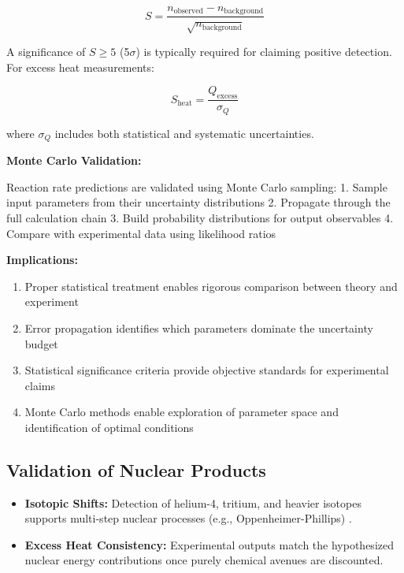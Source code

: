 \documentclass[11pt,a4paper]{article}
\begin{document}
\begin{equation}
S = \frac{n_{\text{observed}} - n_{\text{background}}}{\sqrt{n_{\text{background}}}}
\end{equation}

A significance of $S \geq 5$ (5$\sigma$) is typically required for claiming positive detection. For excess heat measurements:

\begin{equation}
S_{\text{heat}} = \frac{Q_{\text{excess}}}{\sigma_Q}
\end{equation}

where $\sigma_Q$ includes both statistical and systematic uncertainties.

\textbf{Monte Carlo Validation:}

Reaction rate predictions are validated using Monte Carlo sampling: 1. Sample input parameters from their uncertainty distributions 2. Propagate through the full calculation chain 3. Build probability distributions for output observables 4. Compare with experimental data using likelihood ratios

\textbf{Implications:}

\begin{enumerate}
\def\labelenumi{\arabic{enumi}.}
\item
  Proper statistical treatment enables rigorous comparison between theory and experiment
\item
  Error propagation identifies which parameters dominate the uncertainty budget
\item
  Statistical significance criteria provide objective standards for experimental claims
\item
  Monte Carlo methods enable exploration of parameter space and identification of optimal conditions
\end{enumerate}

\subsection{Validation of Nuclear Products}

\begin{itemize}
\item
  \textbf{Isotopic Shifts:} Detection of helium-4, tritium, and heavier isotopes supports multi-step nuclear processes (e.g., Oppenheimer-Phillips) \citep{steinetz2020,pines2020}.
\item
  \textbf{Excess Heat Consistency:} Experimental outputs match the hypothesized nuclear energy contributions once purely chemical avenues are discounted.
\end{itemize}
\end{document}

